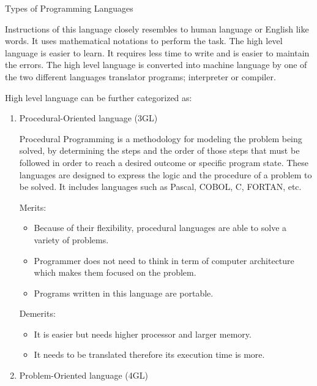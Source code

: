 \documentclass[11pt,titlepage,fleqn]{article}
\begin{document}
\begin{section}{Types of Programming Languages}
\begin{enumerate}
Instructions of this language closely resembles to human language or English like words. It uses mathematical notations to perform the task. The high level language is easier to learn. It requires less time to write and is easier to maintain the errors. The high level language is converted into machine language by one of the two different languages translator programs; interpreter or compiler.

High level language can be further categorized as:
\begin{enumerate}
\item  Procedural-Oriented language (3GL)

Procedural Programming is a methodology for modeling the problem being solved, by determining the steps and the order of those steps that must be followed in order to reach a desired outcome or specific program state. These languages are designed to express the logic and the procedure of a problem to be solved. It includes languages such as Pascal, COBOL, C, FORTAN, etc.

Merits:
\begin{itemize}
\item  Because of their flexibility, procedural languages are able to solve a variety of problems.
\item  Programmer does not need to think in term of computer architecture which makes them focused on the problem.
\item  Programs written in this language are portable.
\end{itemize}
Demerits:
\begin{itemize}
\item  It is easier but needs higher processor and larger memory.
\item  It needs to be translated therefore its execution time is more.
\end{itemize}

\item  Problem-Oriented language (4GL)


\end{enumerate}
\end{enumerate}
\end{section}
\end{document}
